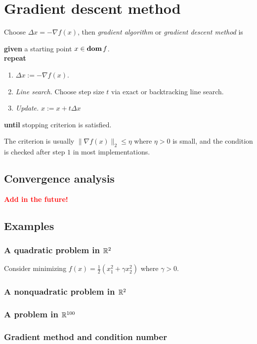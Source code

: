 \section{Gradient descent method}
Choose $\Delta x=-\nabla f(x)$, then \textit{gradient algorithm} or \textit{gradient descent method} is
\begin{algorithm}
  $ $\\
  \textbf{given} a starting point $x\in\mathop{\bf dom} f$.\\
  \textbf{repeat}
  \begin{enumerate}
    \item $\Delta x:=-\nabla f(x)$.
    \item \textit{Line search.} Choose step size $t$ via exact or backtracking line search.
    \item \textit{Update.} $x:=x+t\Delta x$
  \end{enumerate}
  \textbf{until} stopping criterion is satisfied.
\end{algorithm}
The criterion is usually $\|\nabla f(x)\|_2\le\eta$ where $\eta>0$ is small, and the condition is checked after step $1$ in most implementations.

\subsection{Convergence analysis}
\textcolor{red}{\textbf{Add in the future!}}

\subsection{Examples}
\subsubsection{A quadratic problem in $\mathbb{R}^2$}
Consider minimizing $f(x)=\frac{1}{2}(x_1^2+\gamma x_2^2)$ where $\gamma>0$.

\subsubsection{A nonquadratic problem in $\mathbb{R}^2$}
\subsubsection{A problem in $\mathbb{R}^{100}$}
\subsubsection{Gradient method and condition number}
